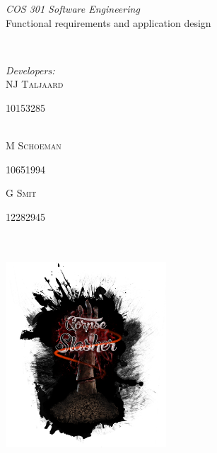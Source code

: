 \documentclass[letterpaper]{article}
\makeatletter
\def\printauthor{%
    {\large \@author}}
\makeatother
\begin{document}
\begin{titlepage}
\begin{center}
\begin{minipage}{0.4\textwidth}
\begin{flushleft} \large
\emph{COS 301 Software Engineering}\\
\vspace{1cm}
Functional requirements and application design
\end{flushleft}
\end{minipage}
~
\begin{minipage}{0.4\textwidth}
	\begin{flushright} \large
	\emph{Developers:} \\
		NJ \textsc{Taljaard} \\
			\begin{small}
				10153285
			\end{small} \\
		M  \textsc{Schoeman} \\
			\begin{small}
				10651994 \\
			\end{small}
		G  \textsc{Smit} \\
			\begin{small}
				12282945
			\end{small}
	\end{flushright}
\end{minipage}\\



\includegraphics[width=60mm, height=80mm]{corpseslasher.png}\\ %
 
\end{center}
\vfill %

\end{titlepage}
\end{document}
